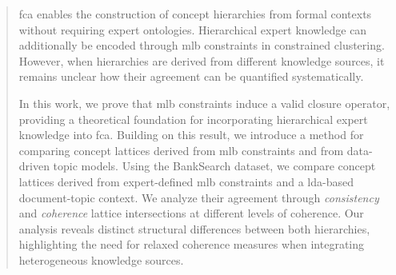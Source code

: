 \begin{abstract}


\ac{fca} enables the construction of concept hierarchies from formal contexts without requiring expert ontologies. 
Hierarchical expert knowledge can additionally be encoded through \ac{mlb} constraints in constrained clustering.
However, when hierarchies are derived from different knowledge sources, it remains unclear how their agreement can be quantified systematically.

In this work, we prove that \acs{mlb} constraints induce a valid closure operator, providing a theoretical foundation for incorporating hierarchical expert knowledge into \ac{fca}. 
Building on this result, we introduce a method for comparing concept lattices derived from \acs{mlb} constraints and from data-driven topic models. 
Using the BankSearch dataset, we compare concept lattices derived from expert-defined \acs{mlb} constraints and a \acl{lda}-based document-topic context. We analyze their agreement through \textit{consistency} and \textit{coherence} lattice intersections at different levels of coherence.
Our analysis reveals distinct structural differences between both hierarchies, highlighting the need for relaxed coherence measures when integrating heterogeneous knowledge sources.



\end{abstract}
